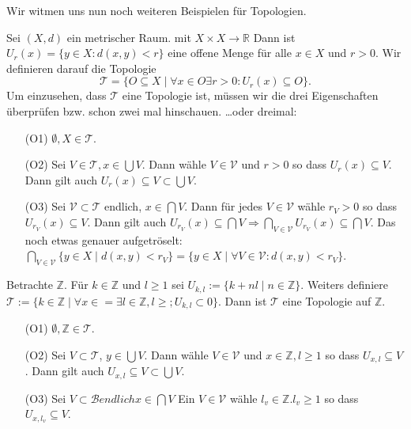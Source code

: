 Wir witmen uns nun noch weiteren Beispielen für Topologien. 

{
Sei $(X,d)$ ein metrischer Raum. mit $X \times X \to \mathbb{R}$ Dann ist $U_{r}(x) = \{y \in X : d(x,y) < r\}$
eine offene Menge für alle $x \in X$ und $r > 0$. Wir definieren darauf die Topologie 
$$\mathcal{T} = \{ O \subseteq X \mid \forall x \in O \exists r > 0 : U_r(x) \subseteq O \}.$$  
Um einzusehen, dass $\mathcal{T}$ eine Topologie ist, müssen wir die drei Eigenschaften überprüfen bzw. schon zwei mal hinschauen.
\dots oder dreimal:
\begin{itemize}
    \item[(O1)] $\emptyset, X \in \mathcal{T}$.
    \item[(O2)] Sei $V \in \mathcal{T}, x\in \bigcup V$. Dann wähle $V \in \mathcal{V}$ 
    und $r > 0$ so dass $U_r(x) \subseteq V$. Dann gilt auch $U_r(x) \subseteq V \subset \bigcup V$.
    \item[(O3)] Sei $\mathcal{V} \subset \mathcal{T}$ endlich, $x \in \bigcap V$. Dann für jedes $V \in \mathcal{V}$ wähle
    $r_V > 0$ so dass $U_{r_V}(x) \subseteq V$. 
    Dann gilt auch $U_{r_V}(x) \subseteq \bigcap V \Rightarrow \underset{V \in \mathcal{V}}{\bigcap} U_{r_V}(x) \subseteq \bigcap V$.
    Das noch etwas genauer aufgetröselt: $\underset{V \in \mathcal{V}}{\bigcap}\{y \in X \mid d(x,y) < r_V\} 
    = \{y \in X \mid \forall V \in \mathcal{V}: d(x,y) < r_V\}$.
\end{itemize}
}

{
Betrachte $\mathbb{Z}$. Für $k \in \mathbb{Z}$ und $l \ge 1$ sei $U_{k,l} := \{k+nl \mid n \in \mathbb{Z}\}$. 
Weiters definiere $\mathcal{T} := \{ k \in \mathbb{Z} \mid \forall x \in = \exists l \in \mathbb{Z}, l \ge ; U_{k,l} \subset 0\}$.
Dann ist $\mathcal{T}$ eine Topologie auf $\mathbb{Z}$.
\begin{itemize}
    \item[(O1)] $\emptyset, \mathbb{Z} \in \mathcal{T}$.
    \item[(O2)] Sei $V \subset \mathcal{T}$, $y\in \bigcup V$. 
    Dann wähle $V \in \mathcal{V}$ und $x \in \mathbb{Z}, l \ge 1$ so dass $U_{x,l} \subseteq V$.
    Dann gilt auch $U_{x,l} \subseteq V \subset \bigcup V$.
    \item[(O3)] Sei $V \subset\mathcal{B} endlich x \in \bigcap V$ Ein $V \in \mathcal{V}$ 
    wähle $l_v \in \mathbb{Z}. l_v \ge 1$ so dass $U_{x,l_v} \subseteq V$.
\end{itemize}
}